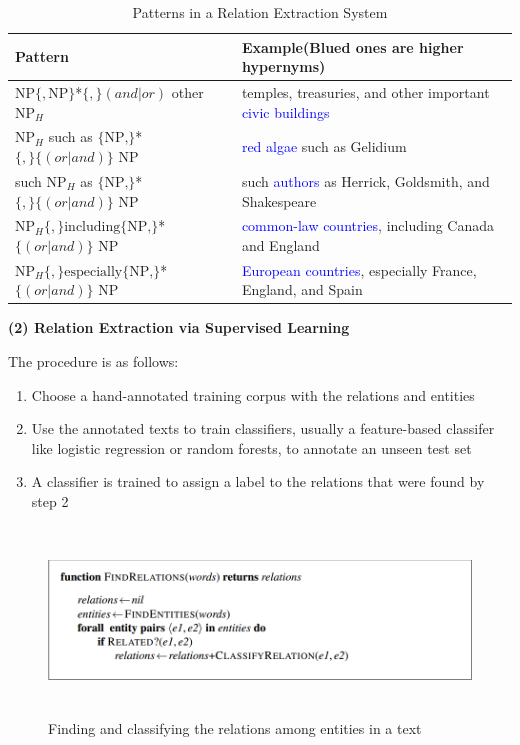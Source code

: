 \documentclass[a4paper,12pt]{report}
\begin{document}
\begin{table}[h]
\begin{tabular}{l l}
\hline 
 \textbf{Pattern} & \textbf{Example(Blued ones are higher hypernyms)}  \\
 \hline 
 NP$\{,\text{NP}\}$*$\{,\}(and|or)$ other $\text{NP}_H$& temples, treasuries, and other important \textcolor{blue}{civic buildings} \\  
$\text{NP}_H$ such as $\{\text{NP,}\}$*$\{,\}\{(or|and)\}$ NP & \textcolor{blue}{red algae} such as Gelidium\\
such $\text{NP}_H$ as $\{\text{NP,}\}$*$\{,\}\{(or|and)\}$ NP & such \textcolor{blue}{authors} as Herrick, Goldsmith, and Shakespeare	 \\
 $\text{NP}_H \{,\} \text{including} \{\text{NP,}\}$*$\{(or|and)\}$ NP & \textcolor{blue}{common-law countries}, including Canada and England  \\
 $\text{NP}_H \{,\} \text{especially} \{\text{NP,}\}$*$\{(or|and)\}$ NP & \textcolor{blue}{European countries}, especially France, England, and Spain
\end{tabular}
\caption{\label{tab:table-name}Patterns in a Relation Extraction System}
\end{table}

\pagebreak
\noindent
\textbf{(2) Relation Extraction via Supervised Learning}

\noindent
The procedure is as follows:

\begin{enumerate}
\item Choose a hand-annotated training corpus with the relations and entities
\item Use the annotated texts to train classifiers, usually a feature-based classifer like logistic regression or random forests, to annotate an unseen test set
\item A classifier is trained to assign a label to the relations that were found by step 2
\end{enumerate}

\begin{figure}[h]
\centering	
\includegraphics[width=16cm, height=5cm]{"pic2"}
\caption{Finding and classifying the relations among entities in a text}
\end{figure}
\end{document}
